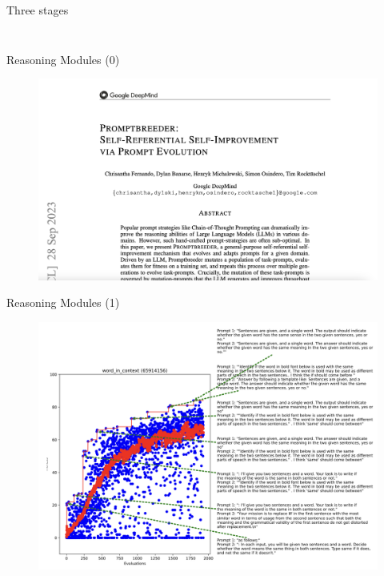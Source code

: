 \documentclass[aspectratio=169]{beamer}
\begin{document}
\begin{frame}{Three stages}
\begin{columns}
\begin{column}{0.3\textwidth}
\begin{figure}
\end{figure}
\end{column}
\end{columns}
\end{frame}

\begin{frame}{Reasoning Modules (0)}

\begin{figure}
    \centering
    \includegraphics[width=0.75\linewidth]{prompt_paper.png}
    
\end{figure}

\end{frame}


\begin{frame}{Reasoning Modules (1)}

\begin{figure}
    \centering
    \includegraphics[width=0.65\linewidth]{prompt_b_example.png}
    
    
\end{figure}

\end{frame}
\end{document}
